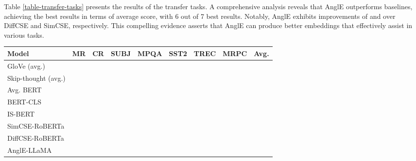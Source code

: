 \documentclass{article} \usepackage{iclr2024_conference,times}
\begin{document}
Table \ref{table-transfer-tasks} presents the results of the transfer tasks. A comprehensive analysis reveals that AnglE outperforms baselines, achieving the best results in terms of average score, with 6 out of 7 best results. Notably, AnglE exhibits improvements of  and  over DiffCSE and SimCSE, respectively. This compelling evidence asserts that AnglE can produce better embeddings that effectively assist in various tasks.

\begin{table*}[ht]
\small
\centering
\begin{threeparttable}
\begin{tabular}{lcccccccc}
\toprule
Model & MR & CR & SUBJ & MPQA & SST2 & TREC & MRPC & Avg. \\

\midrule
\midrule

GloVe (avg.)  &  &  &   &   &  &   &  &   \\ 
Skip-thought (avg.)  &  &  &  &  &   &  &  &  \\
\midrule

Avg. BERT  &  &  &  &  &   &  &  &  \\

BERT-CLS  &  &  &  &  &  &  &  &  \\

IS-BERT  &  &  &  &  &   &  &  &   \\
\midrule

SimCSE-RoBERTa  &  &  &  &  &  &  &  &   \\
DiffCSE-RoBERTa  &  &  &  &  &  &  &  &  \\

\midrule
AnglE-LLaMA &  &  &  &  &  &  &  &  \\
\bottomrule

\end{tabular}
\end{threeparttable}
\caption{Transfer task results of different sentence embedding models (measured as accuracy). : results from \citet{sbert-nils-2019}; : results from \citet{zhang-etal-2020-unsupervised}; : results from \citet{simcse_gao_2021}. : results from \citet{chuang-etal-2022-diffcse}.}
\label{table-transfer-tasks}
\end{table*}
\end{document}
